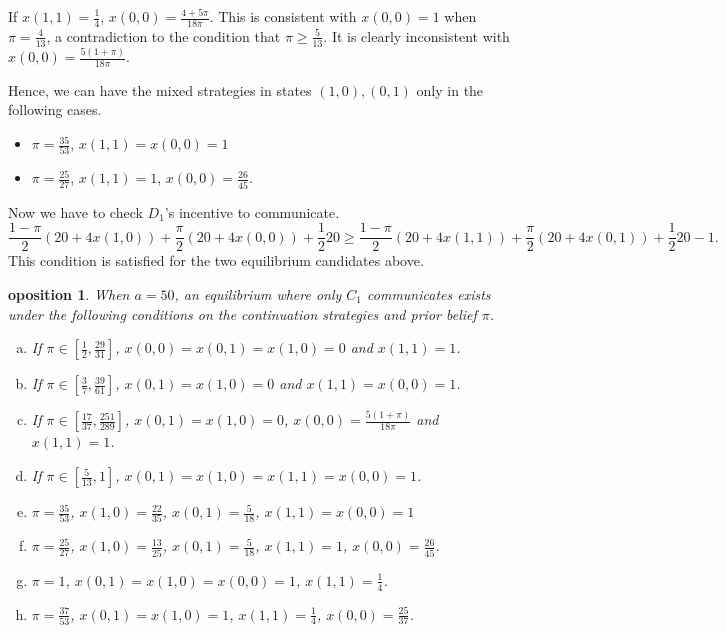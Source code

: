 \documentclass[12pt]{article}
\newtheorem{proposition}{\text{Pr}oposition}
\theoremstyle{definition}
\theoremstyle{remark}
\begin{document}
\begin{itemize}
If $x(1,1)=\frac{1}{4}$, $x(0,0)=\frac{4+5\pi}{18\pi}$. This is consistent with $x(0,0)=1$ when $\pi=\frac{4}{13}$, a contradiction to the condition that $\pi\geq \frac{5}{13}$. It is clearly inconsistent  with $x(0,0)=\frac{5(1+\pi)}{18\pi}$. 

Hence, we can have  the mixed strategies in states $(1,0),(0,1)$ only in the following cases.
\begin{itemize}
    \item $\pi=\frac{35}{53}$, $x(1,1)=x(0,0)=1$
    \item $\pi=\frac{25}{27}$, $x(1,1)=1$, $x(0,0)=\frac{26}{45}$.
\end{itemize}
\end{itemize}

Now we have to check $D_1$'s incentive to communicate.
\[
\frac{1-\pi}{2}(20+4x(1,0))+\frac{\pi}{2}(20+4x(0,0))+\frac{1}{2}20\geq \frac{1-\pi}{2}(20+4x(1,1))+\frac{\pi}{2}(20+4 x(0,1))+\frac{1}{2}20-1.
\]
This condition is satisfied for the two equilibrium candidates above.

%
\begin{proposition}\label{prop:CT50-C1}
When $a=50$, an equilibrium where only $C_1$ communicates exists under the following conditions on the continuation strategies and prior belief $\pi$.
	\begin{enumerate}[(a)]
		\item If $\pi\in \left[ \frac{1}{2}, \frac{29}{31} \right]$, $x(0,0)=x(0,1)=x(1,0)=0$ and $x(1,1)=1$.
			
		\item If $\pi\in \left[ \frac{3}{7}, \frac{39}{61} \right]$, $x(0,1)=x(1,0)=0$ and $x(1,1)=x(0,0)=1$.
		
		\item If $\pi\in \left[ \frac{17}{37}, \frac{251}{289} \right]$, $x(0,1)=x(1,0)=0$, $x(0,0)=\frac{5(1+\pi)}{18\pi}$ and $x(1,1)=1$.
		\item If $\pi\in\left[\frac{5}{13},1\right]$, $x(0,1)=x(1,0)=x(1,1)=x(0,0)=1$.
		\item $\pi=\frac{35}{53}$, $x(1,0)=\frac{22}{35}$, $x(0,1)=\frac{5}{18}$, $x(1,1)=x(0,0)=1$
		\item $\pi=\frac{25}{27}$, $x(1,0)=\frac{13}{25}$, $x(0,1)=\frac{5}{18}$, $x(1,1)=1$,  $x(0,0)=\frac{26}{45}$.
		\item $\pi=1$, $x(0,1)=x(1,0)=x(0,0)=1$, $x(1,1)=\frac{1}{4}$.
		\item $\pi=\frac{37}{53}$, $x(0,1)=x(1,0)=1$, $x(1,1)=\frac{1}{4}$, $x(0,0)=\frac{25}{37}$.
		\end{enumerate}
\end{proposition}
\end{document}
